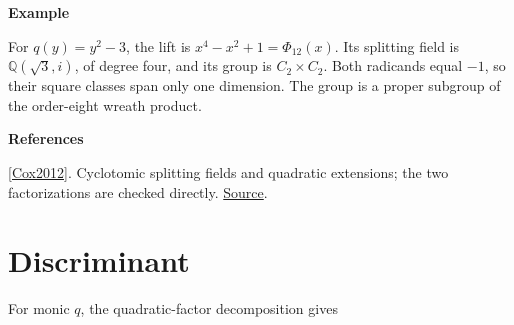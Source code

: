 \documentclass[11pt,a4paper,oneside,openany]{book}
\newenvironment{sources}{\par\smallskip\begingroup\footnotesize\color{atlasgray}\leftskip=10pt\setlength{\parskip}{2pt}}{\par\endgroup\smallskip}
\begin{document}
\begin{atlasblock}[standard]
\textbf{\sffamily Example}\par\smallskip
\color{black} For \(q(y)=y^2-3\), the lift is \(x^4-x^2+1=\Phi_{12}(x)\). Its splitting field is \(\mathbb Q(\sqrt3,i)\), of degree four, and its group is \(C_2\times C_2\). Both radicands equal \(-1\), so their square classes span only one dimension. The group is a proper subgroup of the order-eight wreath product.\par
\end{atlasblock}\color{black}
\begin{sources}
\textbf{References}\par\smallskip
\noindent\hyperlink{ref:Cox2012}{[Cox2012]}. Cyclotomic splitting fields and quadratic extensions; the two factorizations are checked directly. \href{https://onlinelibrary.wiley.com/doi/book/10.1002/9781118218457}{Source}.\par
\end{sources}\color{black}
\section{Discriminant}
\color{black} For monic \(q\), the quadratic-factor decomposition gives\par
\end{document}
